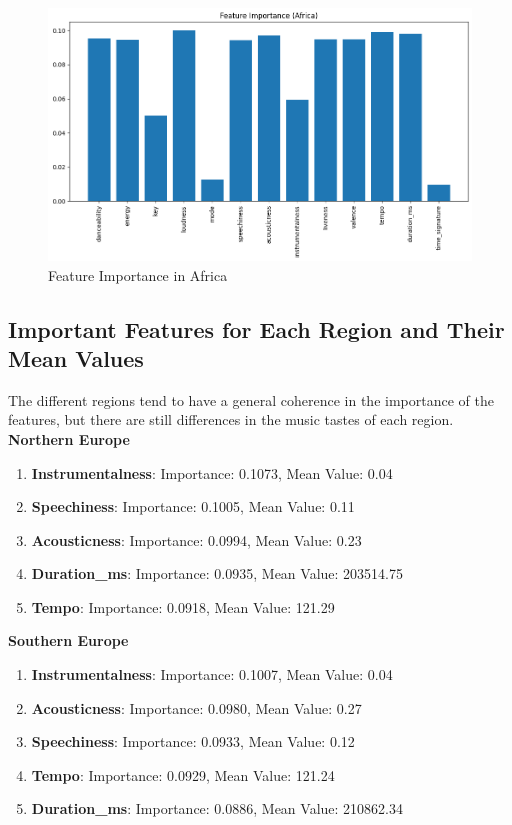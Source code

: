 \begin{figure}[h]
    \centering
    \begin{minipage}{0.45\textwidth}
        \centering
        \includegraphics[width=\linewidth]{media/rf_feature_imp_africa.png}
        \caption{Feature Importance in Africa}
    \end{minipage}
\end{figure}

\clearpage 

\subsection{Important Features for Each Region and Their Mean Values}

The different regions tend to have a general coherence in the importance of the features, but there are still differences in the music tastes of each region.\\



\textbf{Northern Europe}
\begin{enumerate}
    \item \textbf{Instrumentalness}: Importance: 0.1073, Mean Value: 0.04
    \item \textbf{Speechiness}: Importance: 0.1005, Mean Value: 0.11
    \item \textbf{Acousticness}: Importance: 0.0994, Mean Value: 0.23
    \item \textbf{Duration\_ms}: Importance: 0.0935, Mean Value: 203514.75
    \item \textbf{Tempo}: Importance: 0.0918, Mean Value: 121.29
\end{enumerate}

\textbf{Southern Europe}
\begin{enumerate}
    \item \textbf{Instrumentalness}: Importance: 0.1007, Mean Value: 0.04
    \item \textbf{Acousticness}: Importance: 0.0980, Mean Value: 0.27
    \item \textbf{Speechiness}: Importance: 0.0933, Mean Value: 0.12
    \item \textbf{Tempo}: Importance: 0.0929, Mean Value: 121.24
    \item \textbf{Duration\_ms}: Importance: 0.0886, Mean Value: 210862.34
\end{enumerate}

